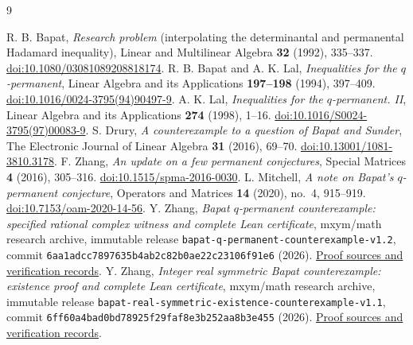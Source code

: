 \documentclass[11pt]{article}
\theoremstyle{remark}
\begin{document}
\begin{thebibliography}{9}
\small
\setlength{\itemsep}{0pt}
\setlength{\parsep}{0pt}
\raggedright
{}
R. B. Bapat, \emph{Research problem} (interpolating the determinantal
and permanental Hadamard inequality), Linear and Multilinear Algebra \textbf{32}
(1992), 335--337.
\href{https://doi.org/10.1080/03081089208818174}{doi:10.1080/03081089208818174}.
R. B. Bapat and A. K. Lal, \emph{Inequalities for the $q$-permanent},
Linear Algebra and its Applications \textbf{197--198} (1994), 397--409.
\href{https://doi.org/10.1016/0024-3795(94)90497-9}{doi:10.1016/0024-3795(94)90497-9}.
A. K. Lal, \emph{Inequalities for the $q$-permanent. II},
Linear Algebra and its Applications \textbf{274} (1998), 1--16.
\href{https://doi.org/10.1016/S0024-3795(97)00083-9}{doi:10.1016/S0024-3795(97)00083-9}.
S. Drury, \emph{A counterexample to a question of Bapat and Sunder},
The Electronic Journal of Linear Algebra \textbf{31} (2016), 69--70.
\href{https://doi.org/10.13001/1081-3810.3178}{doi:10.13001/1081-3810.3178}.
F. Zhang, \emph{An update on a few permanent conjectures},
Special Matrices \textbf{4} (2016), 305--316.
\href{https://doi.org/10.1515/spma-2016-0030}{doi:10.1515/spma-2016-0030}.
L. Mitchell, \emph{A note on Bapat's $q$-permanent conjecture},
Operators and Matrices \textbf{14} (2020), no.~4, 915--919.
\href{https://doi.org/10.7153/oam-2020-14-56}{doi:10.7153/oam-2020-14-56}.
Y. Zhang, \emph{Bapat $q$-permanent counterexample: specified rational
complex witness and complete Lean certificate}, mxym/math research
archive, immutable release \texttt{bapat-q-permanent-counterexample-v1.2},
commit \texttt{6aa1adcc7897635b4ab2c82b0ae22c23106f91e6} (2026).
\href{https://github.com/mxym/math/releases/tag/bapat-q-permanent-counterexample-v1.2}{Proof sources and verification records}.
Y. Zhang, \emph{Integer real symmetric Bapat counterexample: existence
proof and complete Lean certificate}, mxym/math research archive,
immutable release \texttt{bapat-real-symmetric-existence-counterexample-v1.1},
commit \texttt{6ff60a4bad0bd78925f29faf8e3b252aa8b3e455} (2026).
\href{https://github.com/mxym/math/releases/tag/bapat-real-symmetric-existence-counterexample-v1.1}{Proof sources and verification records}.
\end{thebibliography}
\end{document}
